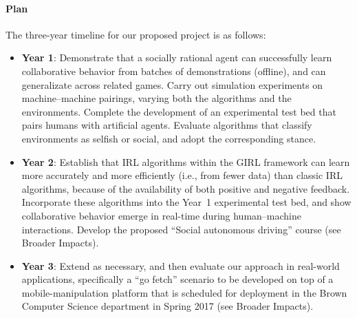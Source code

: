 
\vspace{\up}
\paragraph{Plan}

The three-year timeline for our proposed project is as follows:

\begin{itemize}
\item {\bf Year 1}: Demonstrate that a socially rational agent can
  successfully learn collaborative behavior from batches of
  demonstrations (offline), and can generalizate across related games.
  Carry out simulation experiments on machine--machine pairings,
  varying both the algorithms and the environments.  Complete the
  development of an experimental test bed that pairs humans with
  artificial agents.
%
Evaluate algorithms that classify environments as selfish or social,
and adopt the corresponding stance.


\item {\bf Year 2}: Establish that IRL algorithms within the GIRL
  framework can learn more accurately and more efficiently (i.e., from
  fewer data) than classic IRL algorithms, because of the availability
  of both positive and negative feedback.  Incorporate these
  algorithms into the Year~1 experimental test bed, and show
  collaborative behavior emerge in real-time during human--machine
  interactions.  Develop the proposed ``Social autonomous driving''
  course (see Broader Impacts).  

\item {\bf Year 3}: Extend as necessary, and then evaluate our
  approach in real-world applications, specifically a ``go fetch''
  scenario to be developed on top of a mobile-manipulation platform
  that is scheduled for deployment in the Brown Computer Science
  department in Spring 2017 (see Broader Impacts).  


\end{itemize}


